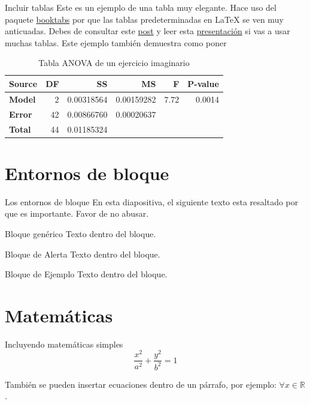 \begin{frame}{Incluir tablas}
Este es un ejemplo de una tabla muy elegante.
Hace uso del paquete \href{https://ctan.org/pkg/booktabs}{booktabs} por que las tablas predeterminadas en \LaTeX{} se ven muy anticuadas.
Debes de consultar este \href{https://jdhao.github.io/2019/08/27/latex_table_with_booktabs/}{post} y leer esta \href{https://people.inf.ethz.ch/markusp/teaching/guides/guide-tables.pdf}{presentación} si vas a usar muchas tablas.
Este ejemplo también demuestra como poner 
\begin{table}[htb]
  \begin{center}
    \begin{tabular}{l | r r r r r}
      \toprule
      Source & \textbf{DF} & \textbf{SS} & \textbf{MS} & \textbf{F} & \textbf{P-value} \\
      \midrule
      \textbf{Model} & 2 & 0.00318564 & 0.00159282 & 7.72 & 0.0014 \\
      \textbf{Error} & 42 & 0.00866760 & 0.00020637 &  & \\
      \midrule
      \textbf{Total} & 44 & 0.01185324 &   &  & \\
      \bottomrule
    \end{tabular}
  \end{center}
\caption{Tabla ANOVA de un ejercicio imaginario}
\end{table}
\end{frame}

\section{Entornos de bloque}
\begin{frame}{Los entornos de bloque}
En esta diapositiva, el siguiente texto esta
\alert{resaltado} por que es importante.
Favor de no abusar.
\begin{block}{Bloque genérico}
    Texto dentro del bloque.
\end{block}

\begin{alertblock}{Bloque de Alerta}
    Texto dentro del bloque.
\end{alertblock}

\begin{exampleblock}{Bloque de Ejemplo}
    Texto dentro del bloque.
\end{exampleblock}   
\end{frame}

\section{Matemáticas}
\begin{frame}{Incluyendo matemáticas simples}
 \begin{equation}
 \label{eq:elipse}
 \frac{x^{2}}{a^{2}} + \frac{y^{2}}{b^{2}} = 1
 \end{equation}
 
  También se pueden insertar ecuaciones dentro de un párrafo, por ejemplo: $\forall x \in \mathbb{R}$.
\end{frame}

